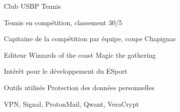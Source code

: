 

\begin{cventries}

  \cventry
    {Club USBP} %
    {Tennis} %
    {} %
    {} %
    {
      \begin{cvitems} %
        \item {Tennis en compétition, classement 30/5}
        \item {Capitaine de la compétition par équipe, coupe Chapignac}
      \end{cvitems}
    }

  \cventry
    {Editeur Wizzards of the coast} %
    {Magic the gathering} %
    {} %
    {} %
    {
      \begin{cvitems} %
        \item {Intérêt pour le développement du ESport}
      \end{cvitems}
    }

  \cventry
    {Outils utilisés} %
    {Protection des données personnelles} %
    {} %
    {} %
    {
      \begin{cvitems} %
        \item {VPN, Signal, ProtonMail, Qwant, VeraCrypt}
      \end{cvitems}
    }

\end{cventries}
